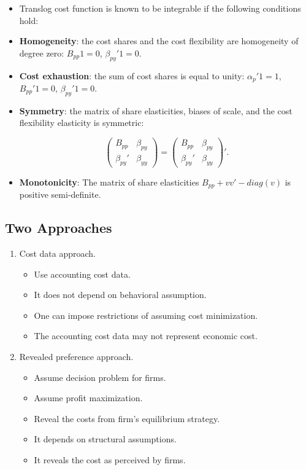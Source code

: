 \documentclass[]{book}
\providecommand{\tightlist}{%
  \setlength{\itemsep}{0pt}\setlength{\parskip}{0pt}}
\begin{document}
\begin{itemize}
\tightlist
\item
  Translog cost function is known to be integrable if the following
  conditions hold:
\item
  \textbf{Homogeneity}: the cost shares and the cost flexibility are
  homogeneity of degree zero: \(B_{pp}1 = 0\), \(\beta_{py}'1 = 0\).
\item
  \textbf{Cost exhaustion}: the sum of cost shares is equal to unity:
  \(\alpha_p'1 = 1\), \(B_{pp}'1 = 0\), \(\beta_{py}'1 = 0\).
\item
  \textbf{Symmetry}: the matrix of share elasticities, biases of scale,
  and the cost flexibility elasticity is symmetric:

  \begin{equation}
  \begin{pmatrix}
  B_{pp} & \beta_{py}\\
  \beta_{py}' & \beta_{yy}
  \end{pmatrix}
  =
  \begin{pmatrix}
  B_{pp} & \beta_{py}\\
  \beta_{py}' & \beta_{yy}
  \end{pmatrix}'.
  \end{equation}
\item
  \textbf{Monotonicity}: The matrix of share elasticities
  \(B_{pp} + vv' - diag(v)\) is positive semi-definite.
\end{itemize}

\subsection{Two Approaches}\label{two-approaches}

\begin{enumerate}
\def\labelenumi{\arabic{enumi}.}
\tightlist
\item
  Cost data approach.

  \begin{itemize}
  \tightlist
  \item
    Use accounting cost data.
  \item
    It does not depend on behavioral assumption.
  \item
    One can impose restrictions of assuming cost minimization.
  \item
    The accounting cost data may not represent economic cost.
  \end{itemize}
\item
  Revealed preference approach.

  \begin{itemize}
  \tightlist
  \item
    Assume decision problem for firms.
  \item
    Assume profit maximization.
  \item
    Reveal the costs from firm's equilibrium strategy.
  \item
    It depends on structural assumptions.
  \item
    It reveals the cost as perceived by firms.
  \end{itemize}
\end{enumerate}
\end{document}

